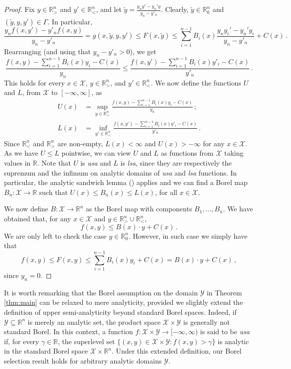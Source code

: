 \documentclass[10pt, a4paper]{article}
\newcommand{\lsa}{\emph{lsa}\xspace}
\newcommand{\R}{\mathbb R}
\newcommand{\usa}{\emph{usa}\xspace}
\newcommand{\X}{\mathcal X}
\newcommand{\Y}{\mathcal Y}
\begin{document}
\begin{proof}
    Fix $y\in \R^n_>$ and $y'\in \R^n_<$, and let $\tilde y = \frac{y_{n}y' - y_{n}'y}{y_{n}-y'_{n}}$. Clearly, $\tilde y\in \R^n_0$ and $(\tilde y, y,y')\in\Gamma$. In particular,
    $$\frac{y_{n}f(x,y') - y'_{n}f(x,y)}{y_{n}-y'_{n}}= g(x, \tilde y, y, y')\leq F(x,\tilde y) \leq \sum_{i=1}^{n-1}B_i(x)\frac{y_{n}y_i' - y_{n}'y_i}{y_{n}-y'_{n}} + C(x)\,.$$
    Rearranging (and using that $y_{n}-y'_{n}>0$), we get
    $$\frac{f(x,y)-\sum_{i=1}^{n-1} B_i(x)y_i -C(x)}{y_{n}}\leq \frac{f(x,y')-\sum_{i=1}^{n-1} B_i(x)y'_i-C(x)}{y'_{n}}\,.$$
    This holds for every $x\in\X$, $y\in \R^n_>$, and $y'\in \R^n_<$. We now define the functions $U$ and $L$, from $\X$ to $[-\infty,\infty]$, as
    \begin{align*}U(x) &= \sup_{y\in \R^n_>}\frac{f(x,y)-\sum_{i=1}^{n-1} B_i(x)y_i -C(x)}{y_{n}}\,;\\ L(x) &= \inf_{y'\in \R^n_<}\frac{f(x,y')-\sum_{i=1}^{n-1} B_i(x)y'_i-C(x)}{y'_{n}}\,.\end{align*} Since $\R^n_<$ and $\R^n_>$ are non-empty, $L(x)<\infty$ and $U(x)>-\infty$ for any $x\in\X$. As we have $U\leq L$ pointwise, we can view $U$ and $L$ as functions from $\X$ taking values in $\R$. Note that $U$ is \usa and $L$ is \lsa, since they are respectively the supremum and the infimum on analytic domains of \usa and \lsa functions. In particular, the analytic sandwich lemma () applies and we can find a Borel map $B_n:\X\to\R$ such that $U(x)\leq B_n(x)\leq L(x)$, for all $x\in\X$. 
    
    We now define $B:\X\to\R^n$ as the Borel map with components $B_1,\dots, B_n$. We have  obtained that, for any $x\in\X$ and $y\in \R^n_>\cup \R^n_<$, 
    $$f(x,y) \leq B(x)\cdot y + C(x)\,.$$ We are only left to check the case $y\in \R^n_0$. However, in such case we simply have that
    $$f(x,y)\leq F(x,y)\leq \sum_{i=1}^{n-1} B_i(x) y_i +C(x) = B(x)\cdot y + C(x)\,,$$ since $y_{n}=0$.
\end{proof}
It is worth remarking that the Borel assumption on the domain $\Y$ in Theorem \ref{thm:main} can be relaxed to mere analyticity, provided we slightly extend the definition of upper semi-analyticity beyond standard Borel spaces. Indeed, if $\Y \subseteq \mathbb R^n$ is merely an analytic set, the product space $\X \times \Y$ is generally not standard Borel. In this context, a function $f: \X \times \Y \to [-\infty, \infty)$ is said to be \usa if, for every $\gamma \in \mathbb R$, the superlevel set $\{(x,y) \in \X \times \Y : f(x,y) > \gamma\}$ is analytic in the standard Borel space $\X \times \mathbb R^n$. Under this extended definition, our Borel selection result holds for arbitrary analytic domains $\Y$.
\end{document}
